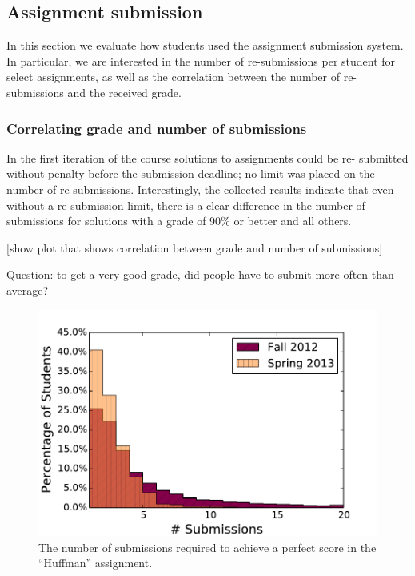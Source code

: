 \documentclass{sig-alternate}
\begin{document}
\subsection{Assignment submission}

In this section we evaluate how students used the assignment submission
system. In particular, we are interested in the number of re-submissions per
student for select assignments, as well as the correlation between the number
of re-submissions and the received grade.

\subsubsection{Correlating grade and number of submissions}

In the first iteration of the course solutions to assignments could be re-
submitted without penalty before the submission deadline; no limit was placed
on the number of re-submissions. Interestingly, the collected results indicate
that even without a re-submission limit, there is a clear difference in the
number of submissions for solutions with a grade of 90\% or better and all
others.

[show plot that shows correlation between grade and number of submissions]


Question: to get a very good grade, did people have to submit more often than average?

\begin{figure}[ht!]
 \centering
 \includegraphics[width=\columnwidth]{plots/top-scores-submissions-histogram.pdf}
 \caption{The number of submissions required to achieve a perfect score in the ``Huffman'' assignment.}
 \label{fig:top-scores-submissions}
\end{figure}
\end{document}
